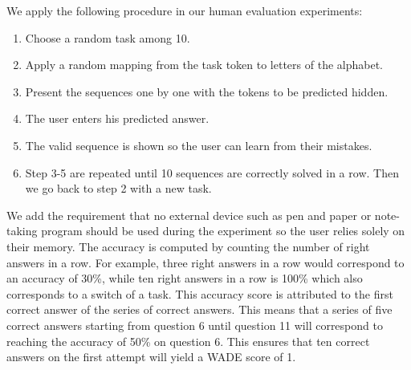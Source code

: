 We apply the following procedure in our human evaluation experiments:
\begin{enumerate}
  \item Choose a random task among 10.
  \item Apply a random mapping from the task token to letters of the alphabet.
  \item Present the sequences one by one with the tokens to be predicted hidden.
  \item The user enters his predicted answer.
  \item The valid sequence is shown so the user can learn from their mistakes.
  \item Step 3-5 are repeated until 10 sequences are correctly solved in a row.
  Then we go back to step 2 with a new task.
\end{enumerate}
We add the requirement that no external device such as pen and paper or
note-taking program should be used during the experiment so the user relies
solely on their memory. The accuracy is computed by counting the number of right
answers in a row. For example, three right answers in a row would correspond to
an accuracy of 30\%, while ten right answers in a row is 100\% which also
corresponds to a switch of a task. This accuracy score is attributed to the
first correct answer of the series of correct answers. This means that a series
of five correct answers starting from question 6 until question 11 will
correspond to reaching the accuracy of 50\% on question 6. This ensures that ten
correct answers on the first attempt will yield a WADE score of 1.

